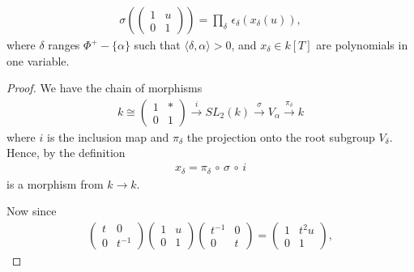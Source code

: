 \begin{lemma} \label{claim1}
\begin{eqnarray*}
\sigma\left(\left(\begin{matrix} 1 & u \\ 0 & 1 \end{matrix}\right)\right) = \prod_\delta\, \epsilon_\delta\left(x_\delta\left(u\right)\right),
\end{eqnarray*}
where $\delta$ ranges $\Phi^+ - \{\alpha\}$ such that $\langle \delta, \alpha \rangle > 0$, and $x_\delta\in k[T]$ are polynomials in one variable.
\end{lemma}
\begin{proof}
We have the chain of morphisms
\begin{eqnarray*}
k\cong \left(\begin{matrix}1 & * \\ 0 & 1\end{matrix}\right) 
\stackrel{i}\longrightarrow SL_2(k) 
\stackrel{\sigma}\longrightarrow V_\alpha 
\stackrel{\pi_\delta}\longrightarrow k
\end{eqnarray*}
where $i$ is the inclusion map and $\pi_\delta$ the projection onto the root subgroup $V_\delta$. Hence, by the definition
\begin{eqnarray*}
x_\delta = \pi_\delta\, \circ\, \sigma\, \circ\, i
\end{eqnarray*}
is a morphism from $k \rightarrow k$.

Now since
\begin{eqnarray*}
\left(\begin{matrix}
t & 0 \\ 0 & t^{-1}
\end{matrix}\right)
\left(\begin{matrix}
1 & u \\ 0 & 1
\end{matrix}\right)
\left(\begin{matrix}
t^{-1} & 0 \\ 0 & t
\end{matrix}\right)
=
\left(\begin{matrix}
1 & t^2u \\ 0 & 1
\end{matrix}\right),
\end{eqnarray*}


\end{proof}
